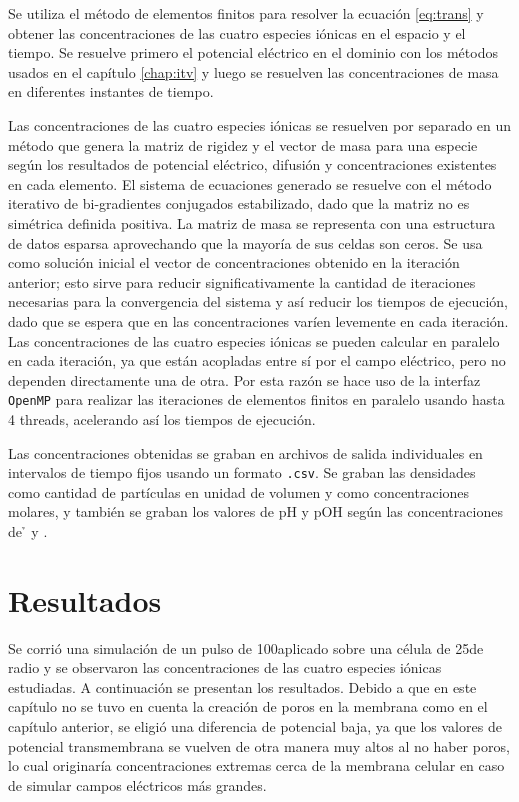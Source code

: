 Se utiliza el método de elementos finitos para resolver la ecuación \ref{eq:trans} y obtener las concentraciones de las cuatro especies iónicas en el espacio y el tiempo. Se resuelve primero el potencial eléctrico en el dominio con los métodos usados en el capítulo \ref{chap:itv} y luego se resuelven las concentraciones de masa en diferentes instantes de tiempo.

Las concentraciones de las cuatro especies iónicas se resuelven por separado en un método que genera la matriz de rigidez y el vector de masa para una especie según los resultados de potencial eléctrico, difusión y concentraciones existentes en cada elemento. El sistema de ecuaciones generado se resuelve con el método iterativo de bi-gradientes conjugados estabilizado, dado que la matriz no es simétrica definida positiva. La matriz de masa se representa con una estructura de datos esparsa aprovechando que la mayoría de sus celdas son ceros. Se usa como solución inicial el vector de concentraciones obtenido en la iteración anterior; esto sirve para reducir significativamente la cantidad de iteraciones necesarias para la convergencia del sistema y así reducir los tiempos de ejecución, dado que se espera que en las concentraciones varíen levemente en cada iteración. Las concentraciones de las cuatro especies iónicas se pueden calcular en paralelo en cada iteración, ya que están acopladas entre sí por el campo eléctrico, pero no dependen directamente una de otra. Por esta razón se hace uso de la interfaz \texttt{OpenMP} para realizar las iteraciones de elementos finitos en paralelo usando hasta 4 threads, acelerando así los tiempos de ejecución.

Las concentraciones obtenidas se graban en archivos de salida individuales en intervalos de tiempo fijos usando un formato \texttt{.csv}. Se graban las densidades como cantidad de partículas en unidad de volumen y como concentraciones molares, y también se graban los valores de pH y pOH según las concentraciones de \h{} y \oh. 


\section{Resultados}

Se corrió una simulación de un pulso de 100\vcm aplicado sobre una célula de 25\um de radio y se observaron las concentraciones de las cuatro especies iónicas estudiadas. A continuación se presentan los resultados. Debido a que en este capítulo no se tuvo en cuenta la creación de poros en la membrana como en el capítulo anterior, se eligió una diferencia de potencial baja, ya que los valores de potencial transmembrana se vuelven de otra manera muy altos al no haber poros, lo cual originaría concentraciones extremas cerca de la membrana celular en caso de simular campos eléctricos más grandes.


